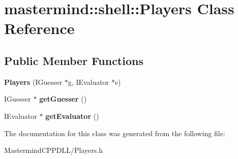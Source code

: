 \hypertarget{classmastermind_1_1shell_1_1_players}{}\section{mastermind\+:\+:shell\+:\+:Players Class Reference}
\label{classmastermind_1_1shell_1_1_players}
\subsection*{Public Member Functions}
\begin{DoxyCompactItemize}
\item 
\hypertarget{classmastermind_1_1shell_1_1_players_a0789193995383df718119738773a4d45}{}\label{classmastermind_1_1shell_1_1_players_a0789193995383df718119738773a4d45} 
{\bfseries Players} (I\+Guesser $\ast$g, I\+Evaluator $\ast$e)
\item 
\hypertarget{classmastermind_1_1shell_1_1_players_a3368fd9a39eec39587aaed55212b8e91}{}\label{classmastermind_1_1shell_1_1_players_a3368fd9a39eec39587aaed55212b8e91} 
I\+Guesser $\ast$ {\bfseries get\+Guesser} ()
\item 
\hypertarget{classmastermind_1_1shell_1_1_players_a81a90b72b70c410d4a963d40ac9c637e}{}\label{classmastermind_1_1shell_1_1_players_a81a90b72b70c410d4a963d40ac9c637e} 
I\+Evaluator $\ast$ {\bfseries get\+Evaluator} ()
\end{DoxyCompactItemize}


The documentation for this class was generated from the following file\+:\begin{DoxyCompactItemize}
\item 
Mastermind\+C\+P\+P\+D\+L\+L/Players.\+h\end{DoxyCompactItemize}
